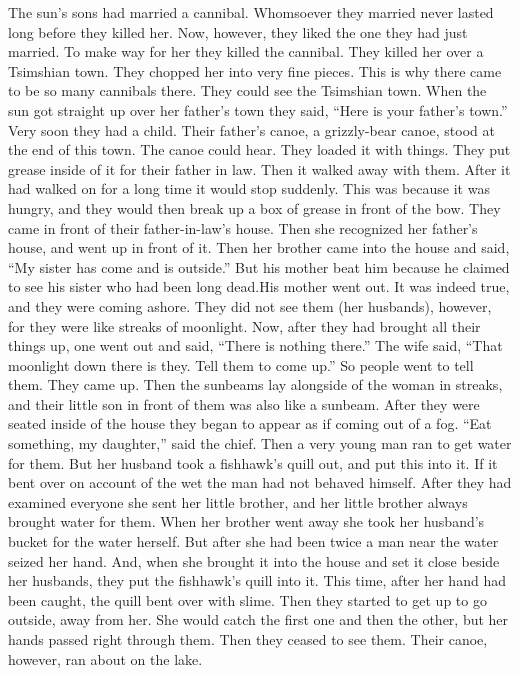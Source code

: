 The sun’s sons had married a cannibal.
Whomsoever they married never lasted long before
they killed her.
Now, however, they liked the one they had just married.
To make way for her they killed the cannibal.
They killed her over a Tsimshian town.
They chopped her into very fine pieces.
This is why there came to be so many cannibals there.
They could see the Tsimshian town.
When the sun got straight up over her father’s town they said,
\qqk{}“Here is your father’s town.”
Very soon they had a child.
Their father’s canoe, a grizzly-bear canoe, stood at the end of this town.
The canoe could hear.
They loaded it with things.
They put grease inside of it for their father in law.
Then it walked away with them.
After it had walked on for a long time it would stop suddenly.
This was because it was hungry, and they would then break up a box of grease in front of the bow.
They came in front of their father-in-law’s house.
Then she recognized her father’s house,
and went up in front of it.
Then her brother came into the house and said,
\qqk{}“My sister has come and is outside.”
But his mother beat him because he claimed to see his sister who had been long dead.His mother went out.
It was indeed true, and they were coming ashore.
They did not see them (her husbands), however,
for they were like streaks of moonlight.
Now, after they had brought all their things up, one went out and said, \qqk{}“There is nothing there.”
The wife said,
\qqk{}“That moonlight down there is they.
Tell them to come up.”
So people went to tell them.
They came up.
Then the sunbeams lay alongside of the woman in streaks,
and their little son in front of them was also like a sunbeam.
After they were seated inside of the house they began to appear as if coming out of a fog.
\qqk{}“Eat something, my daughter,” said the chief.
Then a very young man ran to get water for them.
But her husband took a fishhawk’s quill out,
and put this into it.
If it bent over on account of the wet the man had not behaved himself.
After they had examined everyone she sent her little brother,
and her little brother always brought water for them.
When her brother went away she took her husband’s bucket for the water herself.
But after she had been twice a man near the water seized her hand.
And, when she brought it into the house and set it close beside her husbands, they put the fishhawk’s quill into it.
This time, after her hand had been caught, the quill bent over with slime.
Then they started to get up to go outside, away from her.
She would catch the first one and then the other, but her hands passed right through them.
Then they ceased to see them.
Their canoe, however, ran about on the lake.

